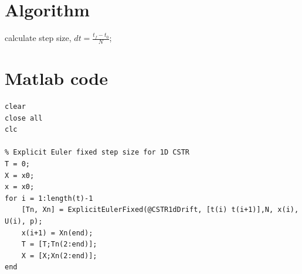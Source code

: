 \section{Algorithm}

\begin{algorithm}
\caption{The explicit Euler algorithm}\label{alg:explicit Euler}
calculate step size, $dt=\frac{t_f-t_0}{N}$;\\

\end{algorithm}

\section{Matlab code}

\begin{lstlisting}[caption=Matlab code example]
clear
close all
clc

% Explicit Euler fixed step size for 1D CSTR
T = 0;
X = x0;
x = x0;
for i = 1:length(t)-1
    [Tn, Xn] = ExplicitEulerFixed(@CSTR1dDrift, [t(i) t(i+1)],N, x(i), U(i), p);
    x(i+1) = Xn(end);
    T = [T;Tn(2:end)];
    X = [X;Xn(2:end)];
end
\end{lstlisting}
\label{lst:MatlabCodeLabel1}